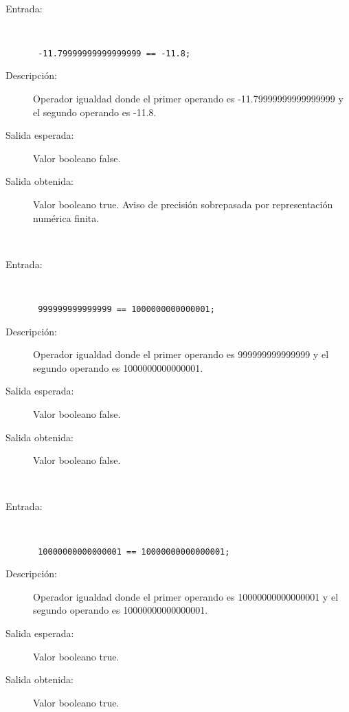 \hfil \\
	\begin{description}
		\item [Entrada:] \hfill \\
\begin{lstlisting}
 -11.79999999999999999 == -11.8;
\end{lstlisting}
		\item [Descripción:] Operador igualdad donde el primer operando es -11.79999999999999999 y el segundo operando es  -11.8.
		\item [Salida esperada:] Valor booleano false.
		\item [Salida obtenida:] Valor booleano true. Aviso de precisión sobrepasada por representación numérica finita.
	\end{description}
\hfil \\
	\begin{description}
		\item [Entrada:] \hfill \\
\begin{lstlisting}
 999999999999999 == 1000000000000001;
\end{lstlisting}
		\item [Descripción:] Operador igualdad donde el primer operando es 999999999999999 y el segundo operando es  1000000000000001.
		\item [Salida esperada:] Valor booleano false.
		\item [Salida obtenida:] Valor booleano false.
	\end{description}
\hfil \\
	\begin{description}
		\item [Entrada:] \hfill \\
\begin{lstlisting}
 10000000000000001 == 10000000000000001;
\end{lstlisting}
		\item [Descripción:] Operador igualdad donde el primer operando es 10000000000000001 y el segundo operando es  10000000000000001.
		\item [Salida esperada:] Valor booleano true.
		\item [Salida obtenida:] Valor booleano true.
	\end{description}
